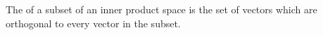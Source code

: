
The 
of a subset of an inner product
space is the set of vectors
which are orthogonal to every
vector in the subset.
